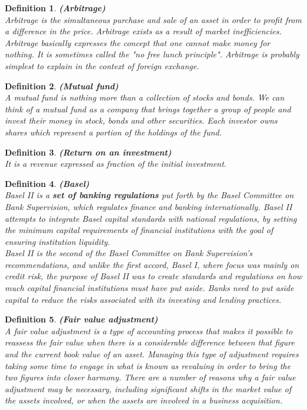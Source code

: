 \documentclass{book}
\newtheorem{definition}{Definition}[section]
\begin{document}
\begin{definition}\textbf{(Arbitrage)}\\
Arbitrage is the simultaneous purchase and sale of an asset in order to profit from a difference in the price. Arbitrage exists as a result of market inefficiencies. Arbitrage basically expresses the concept that one cannot make money for nothing. It is sometimes called the "no free lunch principle". Arbitrage is probably simplest to explain in the context of foreign exchange.
\end{definition}
\begin{definition}\textbf{(Mutual fund)}\\
A mutual fund is nothing more than a collection of stocks and bonds. We can think of a mutual fund as a company that brings together a group of people and invest their money in stock, bonds and other securities. Each investor owns shares which represent a portion of the holdings of the fund.
\end{definition}
\begin{definition}\textbf{(Return on an investment)}\\
It is a revenue expressed as fraction of the initial investment.
\end{definition}
\begin{definition}\textbf{(Basel)}\\
Basel II is a \textbf{set of banking regulations} put forth by the Basel Committee on Bank Supervision, which regulates finance and banking internationally. Basel II attempts to integrate Basel capital standards with national regulations, by setting the minimum capital requirements of financial institutions with the goal of ensuring institution liquidity.\\
Basel II is the second of the Basel Committee on Bank Supervision's recommendations, and unlike the first accord, Basel I, where focus was mainly on credit risk, the purpose of Basel II was to create standards and regulations on how much capital financial institutions must have put aside. Banks need to put aside capital to reduce the risks associated with its investing and lending practices.
\end{definition}
\begin{definition}\textbf{(Fair value adjustment)}\\
A fair value adjustment is a type of accounting process that makes it possible to reassess the fair value when there is a considerable difference between that figure and the current book value of an asset. Managing this type of adjustment requires taking some time to engage in what is known as revaluing in order to bring the two figures into closer harmony. There are a number of reasons why a fair value adjustment may be necessary, including significant shifts in the market value of the assets involved, or when the assets are involved in a business acquisition.
\end{definition}
\end{document}
